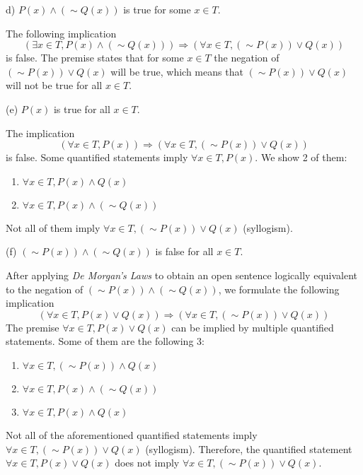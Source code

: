 \documentclass[12pt]{article}
\newenvironment{problem}[2][Problem]{\begin{trivlist}
		\item[\hskip \labelsep {\bfseries #1}\hskip \labelsep {\bfseries #2.}]}{\end{trivlist}}
\newenvironment{solution}[2][Solution]{\begin{trivlist}
		\item[\hskip \labelsep {\bfseries #1}\hskip \labelsep {\bfseries #2.}]}{\end{trivlist}}
\begin{document}
\begin{problem}{73}
(d) $P(x)\wedge (\sim Q(x))$ is true for some $x\in T.$
\begin{solution}{d}
	The following implication
	\begin{equation*}
		(\exists x \in T, P(x)\wedge (\sim Q(x))) \Rightarrow (\forall x \in T, (\sim P(x))\vee Q(x))
	\end{equation*}
is false. The premise states that for some $x \in T$ the negation of $(\sim P(x))\vee Q(x)$ will be true, which means that $(\sim P(x))\vee Q(x)$ will not be true for all $x \in T$.
\end{solution}

(e) $P(x)$ is true for all $x \in T.$
\begin{solution}{e}
	The implication
	\begin{equation*}
		(\forall x \in T, P(x)) \Rightarrow (\forall x \in T, (\sim P(x))\vee Q(x))
	\end{equation*}
	is false. Some quantified statements imply $\forall x \in T, P(x)$. We show 2 of them:
	\begin{enumerate}
		\item $\forall x\in T, P(x)\wedge Q(x)$
		\item $\forall x\in T, P(x)\wedge (\sim Q(x))$
	\end{enumerate} 
Not all of them imply $\forall x \in T, (\sim P(x))\vee Q(x)$ (syllogism). 
\end{solution}

(f) $(\sim P(x))\wedge (\sim Q(x))$ is false for all $x \in T.$
\begin{solution}{f}
	After applying \textit{De Morgan's Laws} to obtain an open sentence logically equivalent to the negation of $(\sim P(x))\wedge (\sim Q(x))$, we formulate the following implication
	\begin{equation*}
		(\forall x \in T, P(x)\vee Q(x))\Rightarrow (\forall x \in T, (\sim P(x))\vee Q(x))
	\end{equation*}
The premise $\forall x \in T, P(x)\vee Q(x)$ can be implied by multiple quantified statements. Some of them are the following 3:
\begin{enumerate}
	\item $\forall x \in T, (\sim P(x))\wedge Q(x)$
	\item $\forall x \in T, P(x) \wedge (\sim Q(x))$
	\item $\forall x \in T, P(x)\wedge Q(x)$
\end{enumerate}
Not all of the aforementioned quantified statements imply $\forall x \in T, (\sim P(x))\vee Q(x)$ (syllogism). Therefore, the quantified statement $\forall x \in T, P(x)\vee Q(x)$ does not imply $\forall x \in T, (\sim P(x))\vee Q(x)$.
\end{solution}
\end{problem}
\end{document}
